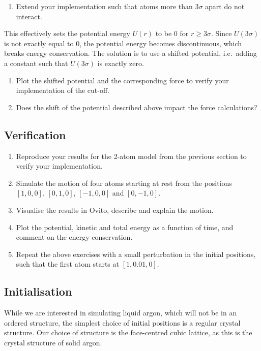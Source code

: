 \documentclass[11pt,british,a4paper]{report}
\begin{document}
\begin{enumerate}[label=\roman*., resume]
    \item Extend your implementation such that atoms more than \(3\sigma\) apart do not interact.
\end{enumerate}

This effectively sets the potential energy \(U(r)\) to be \(0\) for \(r\geq 3\sigma\). Since \(U(3\sigma)\) is not exactly equal to \(0\), the potential energy becomes discontinuous, which breaks energy conservation. The solution is to use a shifted potential, i.e.\ adding a constant such that \(U(3\sigma)\) is exactly zero.

\begin{enumerate}[label=\roman*., resume]
    \item Plot the shifted potential and the corresponding force to verify your implementation of the cut-off.
    \item Does the shift of the potential described above impact the force calculations?
\end{enumerate}

\subsection{Verification}
\begin{enumerate}[label=\roman*.]
     \item Reproduce your results for the 2-atom model from the previous section to verify your implementation.
    \item Simulate the motion of four atoms starting at rest from the positions \([1,0,0]\), \([0,1,0]\), \([-1,0,0]\) and \([0,-1,0]\).
    \item Visualise the results in Ovito, describe and explain the motion.
    \item Plot the potential, kinetic and total energy as a function of time, and comment on the energy conservation.
    \item Repeat the above exercises with a small perturbation in the initial positions, such that the first atom starts at \([1,0.01,0]\).
\end{enumerate}

\subsection{Initialisation}
While we are interested in simulating liquid argon, which will not be in an ordered structure, the simplest choice of initial positions is a regular crystal structure. Our choice of structure is the face-centred cubic lattice, as this is the crystal structure of solid argon.
\end{document}
